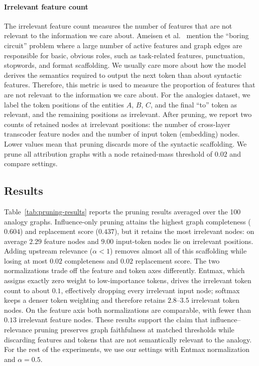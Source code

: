 \documentclass[../main.tex]{subfiles}
\begin{document}
\paragraph{Irrelevant feature count}
The irrelevant feature count measures the number of features that are not relevant to the information we care about.
Ameisen et al.~\cite{ameisen2025circuit} mention the ``boring circuit'' problem where a large number of active features and graph edges are responsible for basic, obvious roles, such as task-related features, punctuation, stopwords, and format scaffolding. We usually care more about how the model derives the semantics required to output the next token than about syntactic features.
Therefore, this metric is used to measure the proportion of features that are not relevant to the information we care about.
For the analogies dataset, we label the token positions of the entities $A$, $B$, $C$, and the final ``to'' token as relevant, and the remaining positions as irrelevant.
After pruning, we report two counts of retained nodes at irrelevant positions: the number of cross-layer transcoder feature nodes and the number of input token (embedding) nodes. Lower values mean that pruning discards more of the syntactic scaffolding.
We prune all attribution graphs with a node retained-mass threshold of $0.02$ and compare settings.
\subsection{Results}

Table~\ref{tab:pruning-results} reports the pruning results averaged over the
100 analogy graphs. Influence-only pruning attains the highest graph
completeness ($0.604$) and replacement score ($0.437$), but it retains the most
irrelevant nodes: on average $2.29$ feature nodes and $9.00$ input-token nodes
lie on irrelevant positions. Adding upstream relevance ($\alpha<1$) removes
almost all of this scaffolding while losing at most $0.02$ completeness and
$0.02$ replacement score. The two normalizations trade off the feature and token
axes differently. Entmax, which assigns exactly zero weight to low-importance
tokens, drives the irrelevant token count to about $0.1$, effectively dropping
every irrelevant input node; softmax keeps a denser token weighting and
therefore retains $2.8$--$3.5$ irrelevant token nodes. On the feature axis both
normalizations are comparable, with fewer than $0.13$ irrelevant feature nodes.
These results support the claim that influence--relevance pruning preserves
graph faithfulness at matched thresholds while discarding features and tokens
that are not semantically relevant to the analogy. For the rest of the experiments, we use our settings with Entmax normalization and $\alpha=0.5$.
\end{document}
